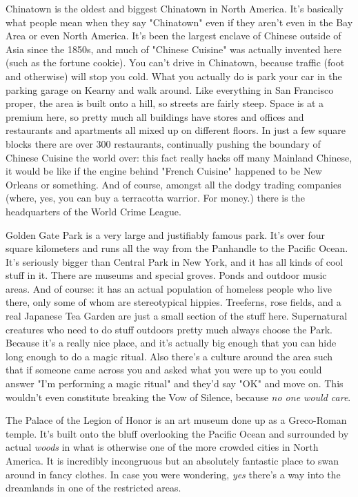 Chinatown is the oldest and biggest Chinatown in North America. It's basically what people mean when they say "Chinatown" even if they aren't even in the Bay Area or even North America. It's been the largest enclave of Chinese outside of Asia since the 1850s, and much of "Chinese Cuisine" was actually invented here (such as the fortune cookie). You can't drive in Chinatown, because traffic (foot and otherwise) will stop you cold. What you actually do is park your car in the parking garage on Kearny and walk around. Like everything in San Francisco proper, the area is built onto a hill, so streets are fairly steep. Space is at a premium here, so pretty much all buildings have stores and offices and restaurants and apartments all mixed up on different floors. In just a few square blocks there are over 300 restaurants, continually pushing the boundary of Chinese Cuisine the world over: this fact really hacks off many Mainland Chinese, it would be like if the engine behind "French Cuisine" happened to be New Orleans or something. And of course, amongst all the dodgy trading companies (where, yes, you can buy a terracotta warrior. For money.) there is the headquarters of the World Crime League.

Golden Gate Park is a very large and justifiably famous park. It's over four square kilometers and runs all the way from the Panhandle to the Pacific Ocean. It's seriously bigger than Central Park in New York, and it has all kinds of cool stuff in it. There are museums and special groves. Ponds and outdoor music areas. And of course: it has an actual population of homeless people who live there, only some of whom are stereotypical hippies. Treeferns, rose fields, and a real Japanese Tea Garden are just a small section of the stuff here. Supernatural creatures who need to do stuff outdoors pretty much always choose the Park. Because it's a really nice place, and it's actually big enough that you can hide long enough to do a magic ritual. Also there's a culture around the area such that if someone came across you and asked what you were up to you could answer "I'm performing a magic ritual" and they'd say "OK" and move on. This wouldn't even constitute breaking the Vow of Silence, because \textit{no one would care}.

The Palace of the Legion of Honor is an art museum done up as a Greco-Roman temple. It's built onto the bluff overlooking the Pacific Ocean and surrounded by actual \textit{woods} in what is otherwise one of the more crowded cities in North America. It is incredibly incongruous but an absolutely fantastic place to swan around in fancy clothes. In case you were wondering, \textit{yes} there's a way into the dreamlands in one of the restricted areas.

